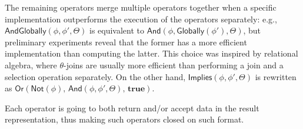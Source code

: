 The remaining operators merge multiple operators together when %
a specific implementation outperforms%
the execution of the operators separately:
 e.g., $\textsf{AndGlobally}(\phi,\phi',\Theta)$ is equivalent to $\textsf{And}(\phi,\textsf{Globally}(\phi'),\Theta)$, but preliminary experiments reveal that the former has a more efficient implementation than computing the latter. This choice was inspired by relational algebra, where $\theta$-joins are usually more efficient than performing a join and a selection operation separately.
 On the other hand, %
 $\textsf{Implies}(\phi,\phi',\Theta)$ is rewritten as $\textsf{Or}(\textsf{Not}(\phi),\,\textsf
{And}(\phi,\phi',\Theta),\,\textbf{true})$.


Each \xLTLf operator is going to both return and/or accept data in the result representation, thus making such operators closed on such format.







